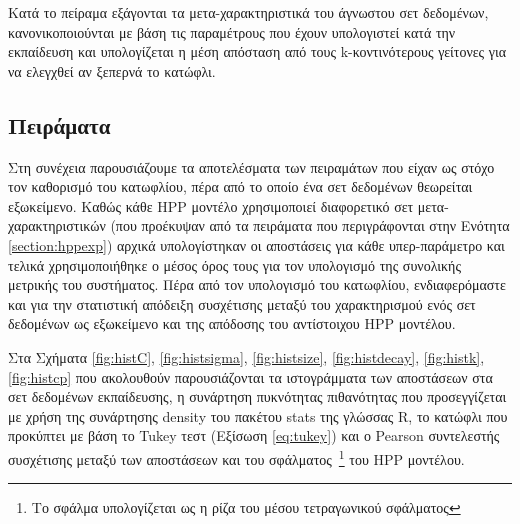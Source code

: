 Κατά το πείραμα εξάγονται τα μετα-χαρακτηριστικά του άγνωστου σετ δεδομένων, κανονικοποιούνται  με βάση τις παραμέτρους που έχουν υπολογιστεί κατά την εκπαίδευση και υπολογίζεται η μέση απόσταση από τους k-κοντινότερους γείτονες για να ελεγχθεί αν ξεπερνά το κατώφλι.

\subsection{Πειράματα}
Στη συνέχεια παρουσιάζουμε τα αποτελέσματα των πειραμάτων που είχαν ως στόχο τον καθορισμό του κατωφλίου, πέρα από το οποίο ένα σετ δεδομένων θεωρείται εξωκείμενο. Καθώς κάθε \gls{HPP} μοντέλο χρησιμοποιεί διαφορετικό σετ μετα-χαρακτηριστικών (που προέκυψαν από τα πειράματα που περιγράφονται στην Ενότητα \ref{section:hppexp}) αρχικά υπολογίστηκαν οι αποστάσεις για κάθε υπερ-παράμετρο και τελικά χρησιμοποιήθηκε ο μέσος όρος τους για τον υπολογισμό της συνολικής μετρικής του συστήματος. Πέρα από τον υπολογισμό του κατωφλίου, ενδιαφερόμαστε και για την στατιστική απόδειξη συσχέτισης μεταξύ του χαρακτηρισμού ενός σετ δεδομένων ως εξωκείμενο και της απόδοσης του αντίστοιχου HPP μοντέλου.

Στα Σχήματα \ref{fig:histC}, \ref{fig:histsigma}, \ref{fig:histsize}, \ref{fig:histdecay}, \ref{fig:histk}, \ref{fig:histcp} που ακολουθούν παρουσιάζονται τα ιστογράμματα των αποστάσεων στα σετ δεδομένων εκπαίδευσης, η συνάρτηση πυκνότητας πιθανότητας που προσεγγίζεται με χρήση της συνάρτησης density του πακέτου stats της γλώσσας R, το κατώφλι που προκύπτει με βάση το Tukey τεστ (Εξίσωση \ref{eq:tukey}) και ο Pearson συντελεστής συσχέτισης μεταξύ των αποστάσεων και του σφάλματος~\footnote{Το σφάλμα υπολογίζεται ως η ρίζα του μέσου τετραγωνικού σφάλματος} του HPP μοντέλου.


